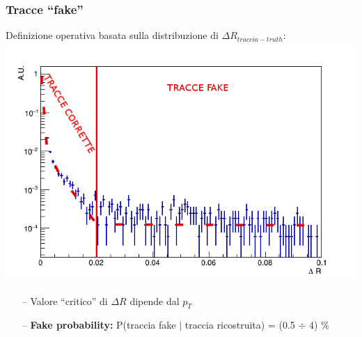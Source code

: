 \documentclass{beamer}
\begin{document}
\begin{frame}
\frametitle{Tracce ``fake''}
Definizione operativa basata sulla distribuzione di $\Delta R_{traccia - truth}$:
\centering
\includegraphics[width=.7\textwidth]{Tracking/pionMatchingDR2}

\begin{itemize}
\item [\color{black}--] Valore ``critico'' di $\Delta R$ dipende dal $p_{T}$
\item[\color{black}--] \textbf{Fake probability:} P(traccia fake $\vert$ traccia ricostruita) = (0.5 $\div$ 4) \%
\end{itemize}
\end{frame}

\end{document}
